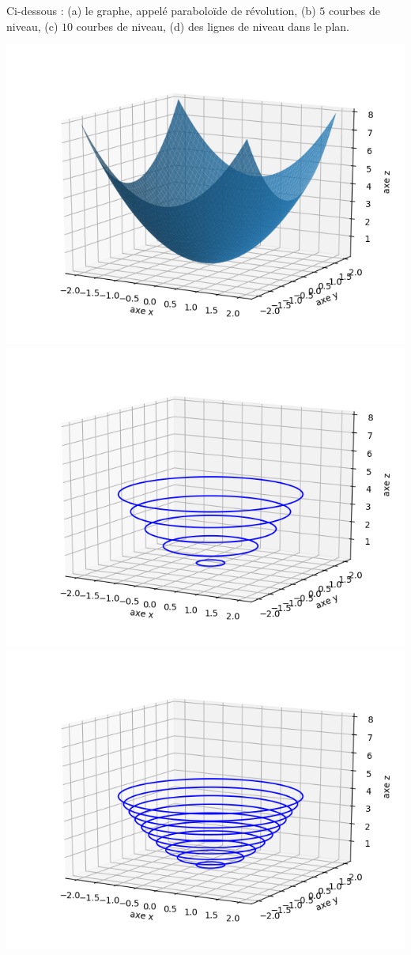 \documentclass[11pt, class=report,crop=false]{standalone}
\begin{document}
\begin{exemple}
Ci-dessous : (a) le graphe, appelé paraboloïde de révolution, (b) $5$ courbes de niveau, (c) $10$ courbes de niveau, (d) des lignes de niveau dans le plan.
\begin{center}
    \includegraphics[scale=\myscale,scale=0.5]{figures/fonctions-niveau-1a}
    \includegraphics[scale=\myscale,scale=0.5]{figures/fonctions-niveau-1b}
    \includegraphics[scale=\myscale,scale=0.5]{figures/fonctions-niveau-1c}

\end{center}
\end{exemple}
\end{document}
